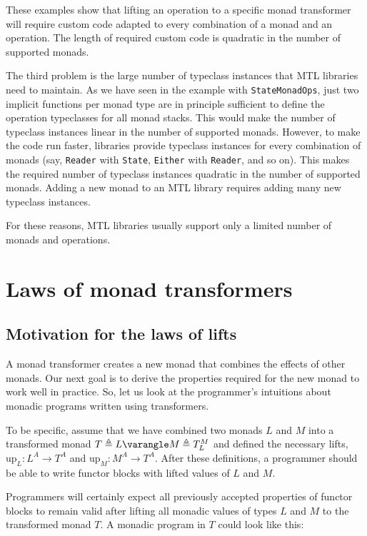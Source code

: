 These examples show that lifting an operation to a specific monad
transformer will require custom code adapted to every combination
of a monad and an operation. The length of required custom code is
quadratic in the number of supported monads.

The third problem is the large number of typeclass instances that
MTL libraries need to maintain. As we have seen in the example with
\lstinline!StateMonadOps!, just two implicit functions per monad
type are in principle sufficient to define the operation typeclasses
for all monad stacks. This would make the number of typeclass instances
linear in the number of supported monads. However, to make the code
run faster, libraries provide typeclass instances for every combination
of monads (say, \lstinline!Reader! with \lstinline!State!, \lstinline!Either!
with \lstinline!Reader!, and so on). This makes the required number
of typeclass instances quadratic in the number of supported monads.
Adding a new monad to an MTL library requires adding many new typeclass
instances.

For these reasons, MTL libraries usually support only a limited number
of monads and operations.

\section{Laws of monad transformers}

\subsection{Motivation for the laws of lifts}

A monad transformer creates a new monad that combines the effects
of other monads. Our next goal is to derive the properties required
for the new monad to work well in practice. So, let us look at the
programmer\textsf{'}s intuitions about monadic programs written using transformers.

To be specific, assume that we have combined two monads $L$ and $M$
into a transformed monad $T\triangleq L\varangle M\triangleq T_{L}^{M}$
and defined the necessary lifts, $\text{up}_{L}:L^{A}\rightarrow T^{A}$
and $\text{up}_{M}:M^{A}\rightarrow T^{A}$. After these definitions,
a programmer should be able to write functor blocks with lifted values
of $L$ and $M$. 

Programmers will certainly expect all previously accepted properties
of functor blocks to remain valid after lifting all monadic values
of types $L$ and $M$ to the transformed monad $T$. A monadic program
in $T$ could look like this:


